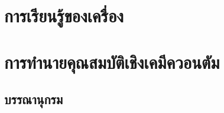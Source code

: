 \mainmatter

\part{การเรียนรู้ของเครื่อง}






\part{การทำนายคุณสมบัติเชิงเคมีควอนตัม}







\begin{appendices}
\renewcommand{\thesection}{\arabic{section}} %



\end{appendices}

\backmatter

\begin{@empty}
\chapter*{บรรณานุกรม}

\printbibliography[heading=none]
\end{@empty}

\printindex[th]
\printindex[en]




